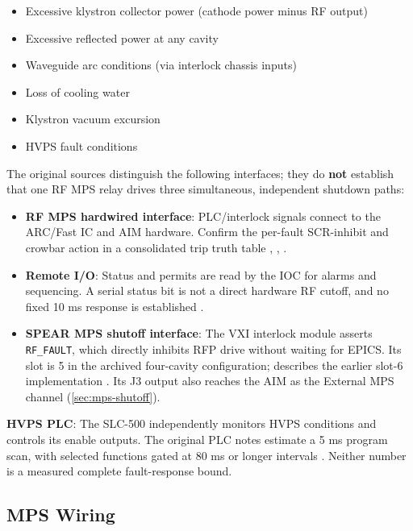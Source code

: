 \begin{itemize}
\tightlist
\item
  Excessive klystron collector power (cathode power minus RF output)
\item
  Excessive reflected power at any cavity
\item
  Waveguide arc conditions (via interlock chassis inputs)
\item
  Loss of cooling water
\item
  Klystron vacuum excursion
\item
  HVPS fault conditions
\end{itemize}

The original sources distinguish the following interfaces; they do \textbf{not} establish that one RF MPS relay drives three simultaneous, independent shutdown paths:

\begin{itemize}
\tightlist
\item
  \textbf{RF MPS hardwired interface}: PLC/interlock signals connect to the ARC/Fast IC and AIM hardware. Confirm the per-fault SCR-inhibit and crowbar action in a consolidated trip truth table , , .
\item
  \textbf{Remote I/O}: Status and permits are read by the IOC for alarms and sequencing. A serial status bit is not a direct hardware RF cutoff, and no fixed 10 ms response is established .
\item
  \textbf{SPEAR MPS shutoff interface}: The VXI interlock module asserts \texttt{RF\_FAULT}, which directly inhibits RFP drive without waiting for EPICS. Its slot is 5 in the archived four-cavity configuration;  describes the earlier slot-6 implementation . Its J3 output also reaches the AIM as the External MPS channel (\cref{sec:mps-shutoff}).
\end{itemize}

\begin{keynote}
\textbf{HVPS PLC}: The SLC-500 independently monitors HVPS conditions and controls its enable outputs. The original PLC notes estimate a 5 ms program scan, with selected functions gated at 80 ms or longer intervals . Neither number is a measured complete fault-response bound.
\end{keynote}

\subsection{MPS Wiring}

